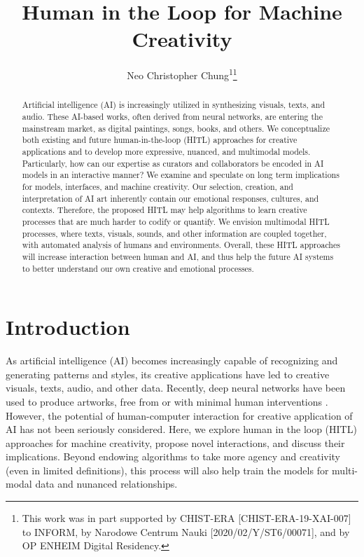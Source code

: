 \documentclass[letterpaper]{article} %
\title{Human in the Loop for Machine Creativity}
\author{
    Neo Christopher Chung\textsuperscript{\rm 1}\thanks{This work was in part supported by CHIST-ERA [CHIST-ERA-19-XAI-007] to INFORM, by Narodowe Centrum Nauki [2020/02/Y/ST6/00071], and by OP ENHEIM Digital Residency.}
    \\
}
\begin{document}
\maketitle

\begin{abstract}
Artificial intelligence (AI) is increasingly utilized in synthesizing visuals, texts, and audio. These AI-based works, often derived from neural networks, are entering the mainstream market, as digital paintings, songs, books, and others. We conceptualize both existing and future human-in-the-loop (HITL) approaches for creative applications and to develop more expressive, nuanced, and multimodal models. Particularly, how can our expertise as curators and collaborators be encoded in AI models in an interactive manner? We examine and speculate on long term implications for models, interfaces, and machine creativity. Our selection, creation, and interpretation of AI art inherently contain our emotional responses, cultures, and contexts. Therefore, the proposed HITL may help algorithms to learn creative processes that are much harder to codify or quantify. We envision multimodal HITL processes, where texts, visuals, sounds, and other information are coupled together, with automated analysis of humans and environments. Overall, these HITL approaches will increase interaction between human and AI, and thus help the future AI systems to better understand our own creative and emotional processes.
\end{abstract}

\section{Introduction}
\label{introduction}
As artificial intelligence (AI) becomes increasingly capable of recognizing and generating patterns and styles, its creative applications have led to creative visuals, texts, audio, and other data. Recently, deep neural networks have been used to produce artworks, free from or with minimal human interventions \cite{Gatys2016, Elgammal2017, GANEdmondBelamy}. However, the potential of human-computer interaction for creative application of AI has not been seriously considered. Here, we explore human in the loop (HITL) approaches for machine creativity, propose novel interactions, and discuss their implications. Beyond endowing algorithms to take more agency and creativity (even in limited definitions), this process will also help train the models for multi-modal data and nunanced relationships.
\end{document}
